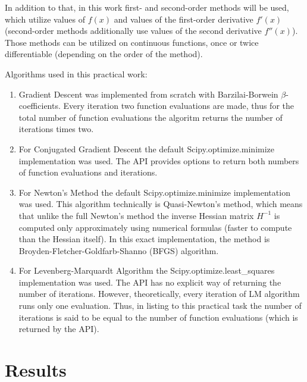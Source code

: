 \documentclass[12pt, a4paper]{article}
\begin{document}
In addition to that, in this work first- and second-order methods will be used, which utilize values of $f(x)$ and values of the first-order derivative $f'(x)$ (second-order methods additionally use values of the second derivative $f''(x)$). Those methods can be utilized on continuous functions, once or twice differentiable (depending on the order of the method).

Algorithms used in this practical work:
\begin{enumerate}
	\item Gradient Descent was implemented from scratch with Barzilai-Borwein $\beta$-coefficients. Every iteration two function evaluations are made, thus for the total number of function evaluations the algoritm returns the number of iterations times two.
	\item For Conjugated Gradient Descent the default Scipy.optimize.minimize implementation was used. The API provides options to return both numbers of function evaluations and iterations.
	\item For Newton's Method the default Scipy.optimize.minimize implementation was used. This algorithm technically is Quasi-Newton's method, which means that unlike the full Newton's method the inverse Hessian matrix $H^{-1}$ is computed only approximately using numerical formulas (faster to compute than the Hessian itself). In this exact implementation, the method is Broyden-Fletcher-Goldfarb-Shanno (BFGS) algorithm.
	\item For Levenberg-Marquardt Algorithm the Scipy.optimize.least\_squares implementation was used. The API has no explicit way of returning the number of iterations. However, theoretically, every iteration of LM algorithm runs only one evaluation. Thus, in listing to this practical task the number of iterations is said to be equal to the number of function evaluations (which is returned by the API).
\end{enumerate}

\newpage

\section*{Results}
\end{document}
